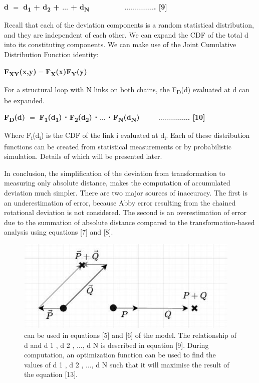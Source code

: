 \documentclass[11pt]{book}
\begin{document}
\textbf{d $=$ d\textsubscript{1} + d\textsubscript{2} + $\ldots$ + d\textsubscript{N} \ \ \ \ \ \ \ \ $\ldots$$\ldots$$\ldots$$\ldots$$\ldots$. [9] }

Recall that each of the deviation components is a random statistical distribution, and they are independent of each other. We can expand the CDF of the total d into its constituting components. We can make use of the Joint Cumulative Distribution Function identity:

\textbf{F\textsubscript{XY}(x,y)$=$F\textsubscript{X}(x)F\textsubscript{Y}(y)}

For a structural loop with N links on both chains, the F\textsubscript{D}(d) evaluated at d can be expanded. 

\textbf{F\textsubscript{D}(d) $=$} \textbf{F\textsubscript{1}(d\textsubscript{1}) ⋅ F\textsubscript{2}(d\textsubscript{2}) ⋅ $\ldots$ ⋅ F\textsubscript{N}(d\textsubscript{N}) \ \ \ \ $\ldots$$\ldots$$\ldots$$\ldots$$\ldots$. [10] }

Where F\textsubscript{i}(d\textsubscript{i}) is the CDF of the link i evaluated at d\textsubscript{i}. Each of these distribution functions can be created from statistical measurements or by probabilistic simulation. Details of which will be presented later.

In conclusion, the simplification of the deviation from transformation to measuring only absolute distance, makes the computation of accumulated deviation much simpler. There are two major sources of inaccuracy. The first is an underestimation of error, because Abby error resulting from the chained rotational deviation is not considered. The second is an overestimation of error due to the summation of absolute distance compared to the transformation-based analysis using equations [7] and [8].

\begin{figure}[H]
\includegraphics[width=10.76cm,height=4.43cm]{./images/image5.jpeg}
\caption{can be used in equations [5] and [6] of the model. The relationship of d and d 1 , d 2 , $\ldots$, d N is described in equation [9]. During computation, an optimization function can be used to find the values of d 1 , d 2 , $\ldots$, d N such that it will maximise the result of the equation [13].}
\label{fig:can_be_used_equations_5}
\end{figure}
\end{document}
